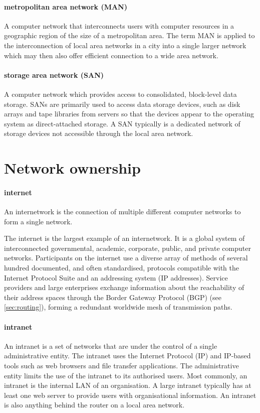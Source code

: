{\paragraph{metropolitan area network (MAN)}
A computer network that interconnects users with computer resources in a geographic region of the size of a metropolitan area.
The term MAN is applied to the interconnection of local area networks in a city into a single larger network which may then also offer efficient connection to a wide area network.

\paragraph{storage area network (SAN)}
A computer network which provides access to consolidated, block-level data storage.
SANs are primarily used to access data storage devices, such as disk arrays and tape libraries from servers so that the devices appear to the operating system as direct-attached storage.
A SAN typically is a dedicated network of storage devices not accessible through the local area network.


\section{Network ownership}
\label{sec:network-ownership}

\paragraph{internet}
An internetwork is the connection of multiple different computer networks to form a single network.

The internet is the largest example of an internetwork.
It is a global system of interconnected governmental, academic, corporate, public, and private computer networks.
Participants on the internet use a diverse array of methods of several hundred documented, and often standardised, protocols compatible with the Internet Protocol Suite and an addressing system (IP addresses).
Service providers and large enterprises exchange information about the reachability of their address spaces through the Border Gateway Protocol (BGP) (see \vref{sec:routing}), forming a redundant worldwide mesh of transmission paths.

\paragraph{intranet}
An intranet is a set of networks that are under the control of a single administrative entity.
The intranet uses the Internet Protocol (IP) and IP-based tools such as web browsers and file transfer applications.
The administrative entity limits the use of the intranet to its authorised users.
Most commonly, an intranet is the internal LAN of an organisation.
A large intranet typically has at least one web server to provide users with organisational information.
An intranet is also anything behind the router on a local area network.

}
